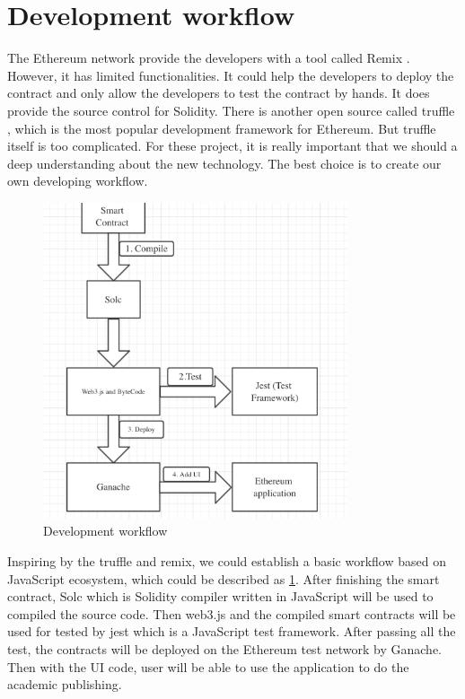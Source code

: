 \documentclass [11pt]{report}
\begin{document}
\section{Development workflow}
The Ethereum network provide the developers with a tool called Remix \cite{remix}. 
However, it has limited functionalities. 
It could help the developers to deploy the contract and only allow the developers to test the contract by hands.
It does provide the source control for Solidity. There is another open source called truffle \cite{truffle}, 
which is the most popular development framework for Ethereum. But truffle itself is too complicated. For these project, 
it is really important that we should a deep understanding about the new technology. The best choice is to create our own developing workflow.
\begin{figure}[H]
  \centering
  \includegraphics[width=0.8\textwidth]{developWorkFlow.png}
  \caption{Development workflow}
  \label{develop} 
\end{figure}
Inspiring by the truffle and remix, we could establish a basic workflow based on JavaScript ecosystem, which could be described as \ref{develop}.
After finishing the smart contract, Solc \cite{solc} which is Solidity compiler written in JavaScript will be used to compiled the source code.
Then web3.js and the compiled smart contracts will be used for tested by jest which is a JavaScript test framework. 
After passing all the test, the contracts will be deployed on the Ethereum test network by Ganache.
Then with the UI code, user will be able to use the application to do the academic publishing.
\end{document}
